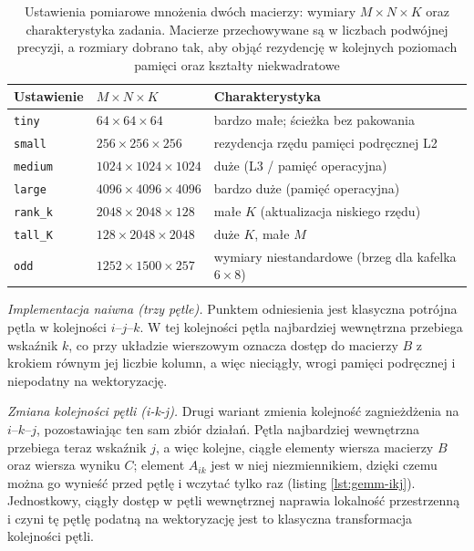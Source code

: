 \documentclass[a4paper,12pt]{book} %
\begin{document}
\begin{table}[t!]
\centering
\caption{Ustawienia pomiarowe mnożenia dwóch macierzy: wymiary $M \times N \times K$ oraz charakterystyka zadania. Macierze przechowywane są w liczbach podwójnej precyzji, a rozmiary dobrano tak, aby objąć rezydencję w kolejnych poziomach pamięci oraz kształty niekwadratowe}
\label{tab:gemm-presety}
\begin{tabular}{p{} p{} p{}}
\hline
Ustawienie & $M \times N \times K$ & Charakterystyka \\
\hline
\texttt{tiny}   & $64 \times 64 \times 64$       & bardzo małe; ścieżka bez pakowania \\
\texttt{small}  & $256 \times 256 \times 256$    & rezydencja rzędu pamięci podręcznej L2 \\
\texttt{medium} & $1024 \times 1024 \times 1024$ & duże (L3 / pamięć operacyjna) \\
\texttt{large}  & $4096 \times 4096 \times 4096$ & bardzo duże (pamięć operacyjna) \\
\texttt{rank\_k} & $2048 \times 2048 \times 128$ & małe $K$ (aktualizacja niskiego rzędu) \\
\texttt{tall\_K} & $128 \times 2048 \times 2048$ & duże $K$, małe $M$ \\
\texttt{odd}    & $1252 \times 1500 \times 257$  & wymiary niestandardowe (brzeg dla kafelka $6 \times 8$) \\
\hline
\end{tabular}
\end{table}

\emph{Implementacja naiwna (trzy pętle).} Punktem odniesienia jest klasyczna potrójna pętla w kolejności $i$--$j$--$k$. W tej kolejności pętla najbardziej wewnętrzna przebiega wskaźnik $k$, co przy układzie wierszowym oznacza dostęp do macierzy $B$ z krokiem równym jej liczbie kolumn, a więc nieciągły, wrogi pamięci podręcznej i niepodatny na wektoryzację.

\emph{Zmiana kolejności pętli (i-k-j).} Drugi wariant zmienia kolejność zagnieżdżenia na $i$--$k$--$j$, pozostawiając ten sam zbiór działań. Pętla najbardziej wewnętrzna przebiega teraz wskaźnik $j$, a więc kolejne, ciągłe elementy wiersza macierzy $B$ oraz wiersza wyniku $C$; element $A_{ik}$ jest w niej niezmiennikiem, dzięki czemu można go wynieść przed pętlę i wczytać tylko raz (listing \ref{lst:gemm-ikj}). Jednostkowy, ciągły dostęp w pętli wewnętrznej naprawia lokalność przestrzenną i czyni tę pętlę podatną na wektoryzację jest to klasyczna transformacja kolejności pętli.
\end{document}
